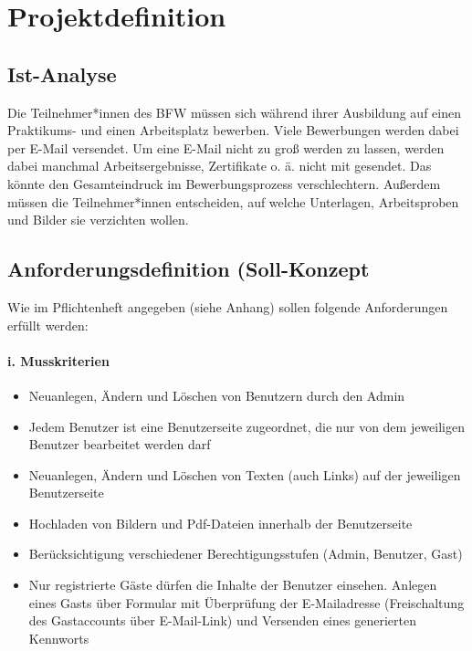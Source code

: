 \documentclass[10.5pt]{scrarticle}
\begin{document}
\section{Projektdefinition}
\subsection{Ist-Analyse}

Die Teilnehmer*innen des BFW müssen sich während ihrer Ausbildung auf einen Praktikums- und einen Arbeitsplatz bewerben. Viele Bewerbungen werden dabei per E-Mail versendet. Um eine E-Mail nicht zu groß werden zu lassen, werden dabei manchmal Arbeitsergebnisse, Zertifikate o. ä. nicht mit gesendet. Das könnte den Gesamteindruck im Bewerbungsprozess verschlechtern.  
 Außerdem müssen die Teilnehmer*innen entscheiden, auf welche Unterlagen, Arbeitsproben und Bilder sie verzichten wollen.
 
\subsection{Anforderungsdefinition (Soll-Konzept}

Wie im Pflichtenheft angegeben (siehe Anhang) sollen folgende Anforderungen erfüllt werden:

\paragraph{i. Musskriterien}

\begin{itemize}
\item Neuanlegen, Ändern und Löschen von Benutzern durch den Admin
\item Jedem Benutzer ist eine Benutzerseite zugeordnet, die nur von dem jeweiligen Benutzer bearbeitet werden darf
\item Neuanlegen, Ändern und Löschen von Texten (auch Links) auf der jeweiligen Benutzerseite
\item Hochladen von Bildern und Pdf-Dateien innerhalb der Benutzerseite
\item Berücksichtigung verschiedener Berechtigungsstufen (Admin, Benutzer, Gast)
\item  Nur registrierte Gäste dürfen die Inhalte der Benutzer einsehen. Anlegen eines Gasts über Formular mit Überprüfung der E-Mailadresse (Freischaltung des Gastaccounts über E-Mail-Link) und Versenden eines generierten Kennworts 
\end{itemize}
\end{document}
